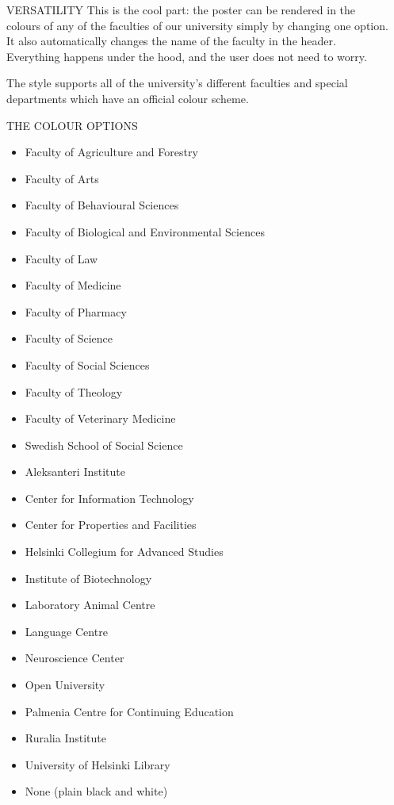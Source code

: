 \documentclass[final]{beamer}
\begin{document}
\begin{frame}[t, fragile]
\begin{columns}[T]
\begin{column}{0.32\linewidth}
\end{column}

\begin{column}{0.32\linewidth}

\begin{block}{VERSATILITY}
This is the cool part: the poster can be rendered in the colours of any of the faculties of our university simply by changing one option. It also automatically changes the name of the faculty in the header. Everything happens under the hood, and the user does not need to worry.

The style supports all of the university's different faculties and special departments which have an official colour scheme.
\end{block}

\begin{block}{THE COLOUR OPTIONS}
\begin{itemize}
\item Faculty of Agriculture and Forestry 
\item Faculty of Arts 
\item Faculty of Behavioural Sciences 
\item Faculty of Biological and Environmental Sciences 
\item Faculty of Law 
\item Faculty of Medicine 
\item Faculty of Pharmacy 
\item Faculty of Science 
\item Faculty of Social Sciences 
\item Faculty of Theology 
\item Faculty of Veterinary Medicine 
\item Swedish School of Social Science
\item Aleksanteri Institute
\item Center for Information Technology
\item Center for Properties and Facilities
\item Helsinki Collegium for Advanced Studies
\item Institute of Biotechnology
\item Laboratory Animal Centre
\item Language Centre
\item Neuroscience Center
\item Open University
\item Palmenia Centre for Continuing Education
\item Ruralia Institute
\item University of Helsinki Library
\item None (plain black and white)
\end{itemize}
\end{block}


\end{column}
\end{columns}
\end{frame}
\end{document}
